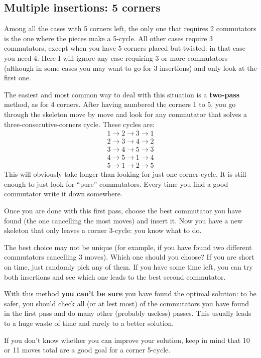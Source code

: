 \documentclass[11pt,a4paper]{book}
\begin{document}
\subsection{Multiple insertions: 5 corners}

Among all the cases with 5 corners left, the only one that requires 2 commutators is the one where the pieces make a 5-cycle. All other cases require 3 commutators, except when you have 5 corners placed but twisted: in that case you need 4. Here I will ignore any case requiring 3 or more commutators (although in some cases you may want to go for 3 insertions) and only look at the first one.

The easiest and most common way to deal with this situation is a \textbf{two-pass} method, as for 4 corners. After having numbered the corners 1 to 5, you go through the skeleton move by move and look for any commutator that solves a three-consecutive-corners cycle. These cycles are:
\begin{align*}
1 \to 2 \to 3 \to 1\\
2 \to 3 \to 4 \to 2\\
3 \to 4 \to 5 \to 3\\
4 \to 5 \to 1 \to 4\\
5 \to 1 \to 2 \to 5
\end{align*}
This will obviously take longer than looking for just one corner cycle. It is still enough to just look for ``pure'' commutators. Every time you find a good commutator write it down somewhere.

Once you are done with this first pass, choose the best commutator you have found (the one cancelling the most moves) and insert it. Now you have a new skeleton that only leaves a corner 3-cycle: you know what to do.

The best choice may not be unique (for example, if you have found two different commutators cancelling 3 moves). Which one should you choose? If you are short on time, just randomly pick any of them. If you have some time left, you can try both insertions and see which one leads to the best second commutator.

With this method \textbf{you can't be sure} you have found the optimal solution: to be safer, you should check all (or at lest most) of the commutators you have found in the first pass and do many other (probably useless) passes. This usually leads to a huge waste of time and rarely to a better solution.

If you don't know whether you can improve your solution, keep in mind that 10 or 11 moves total are a good goal for a corner 5-cycle.
\end{document}

